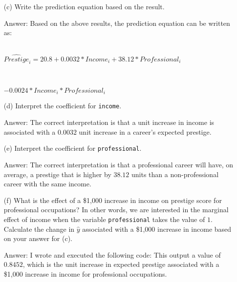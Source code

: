 \documentclass[12pt,letterpaper]{article}
\begin{document}
\begin{enumerate}
	\item [(c)]
	Write the prediction equation based on the result.
	\vspace{.25cm}
	
	\item [Answer:]
	Based on the above results, the prediction equation can be written as:\\
	\\
	\centerline{$\hat{Prestige}_i = 20.8 + 0.0032*Income_i + 38.12*Professional_i$}\\
	\centerline{$- 0.0024*Income_i*Professional_i$}
	\vspace{.5cm}
	
	\item [(d)]
	Interpret the coefficient for \texttt{income}.
	\vspace{.25cm}
	
	\item [Answer:]
	The correct interpretation is that a unit increase in income is associated with a $0.0032$ unit increase in a career's expected prestige.
	\vspace{1cm}
	
	\item [(e)]
	Interpret the coefficient for \texttt{professional}.
	\vspace{.25cm}
	
	\item [Answer:]
	The correct interpretation is that a professional career will have, on average, a prestige that is higher by $38.12$ units than a non-professional career with the same income.
	\vspace{1cm}
	
	\newpage
	\item [(f)]
	What is the effect of a \$1,000 increase in income on prestige score for professional occupations? In other words, we are interested in the marginal effect of income when the variable \texttt{professional} takes the value of $1$. Calculate the change in $\hat{y}$ associated with a \$1,000 increase in income based on your answer for (c).
	\vspace{.25cm}
	
	\item [Answer:]
	I wrote and executed the following code:  This output a value of $0.8452$, which is the unit increase in expected prestige associated with a \$1,000 increase in income for professional occupations.
	\vspace{1cm}	
	

\end{enumerate}
\end{document}
